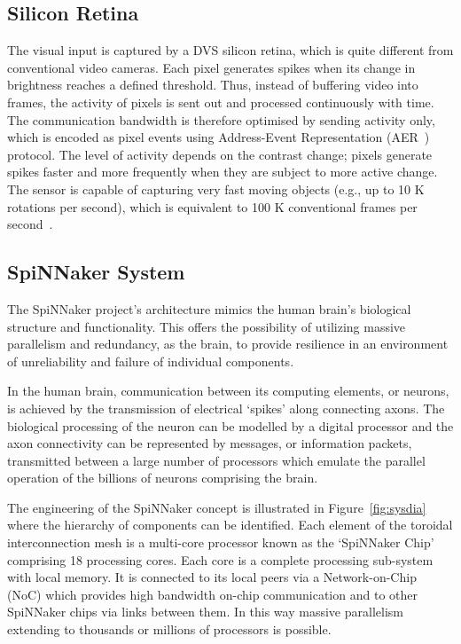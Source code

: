 \documentclass[journal]{journal}
\begin{document}
\subsection{Silicon Retina}
The visual input is captured by a DVS silicon retina, which is quite different from conventional video cameras.
Each pixel generates spikes when its change in brightness reaches a defined threshold.
Thus, instead of buffering video into frames, the activity of pixels is sent out and processed continuously with time.
The communication bandwidth is therefore optimised by sending activity only, which is encoded as pixel events using Address-Event Representation (AER~\cite{lazzaro1995multi}) protocol.
The level of activity depends on the contrast change; pixels generate spikes faster and more frequently when they are subject to more active change.
The sensor is capable of capturing very fast moving objects (e.g., up to 10 K rotations per second), which is equivalent to 100 K conventional frames per second~\cite{lenero20113}.

\subsection{SpiNNaker System}
The SpiNNaker project's architecture mimics the human brain's biological structure and functionality. 
This offers the possibility of utilizing massive parallelism and redundancy, as the brain, to provide resilience in an environment of unreliability and failure of individual components.

In the human brain, communication between its computing elements, or neurons, is achieved by the transmission of electrical `spikes' along connecting axons. 
The biological processing of the neuron can be modelled by a digital processor and the axon connectivity can be represented by messages, or information packets, transmitted between a large number of processors which emulate the parallel operation of the billions of neurons comprising the brain.

The engineering of the SpiNNaker concept is illustrated in Figure~\ref{fig:sysdia} where the hierarchy of components can be identified. 
Each element of the toroidal interconnection mesh is a multi-core processor known as the `SpiNNaker Chip' comprising 18 processing cores. 
Each core is a complete processing sub-system with local memory.
It is connected to its local peers via a Network-on-Chip (NoC) which provides high bandwidth on-chip communication and to other SpiNNaker chips via links between them. 
In this way massive parallelism extending to thousands or millions of processors is possible.
\end{document}
